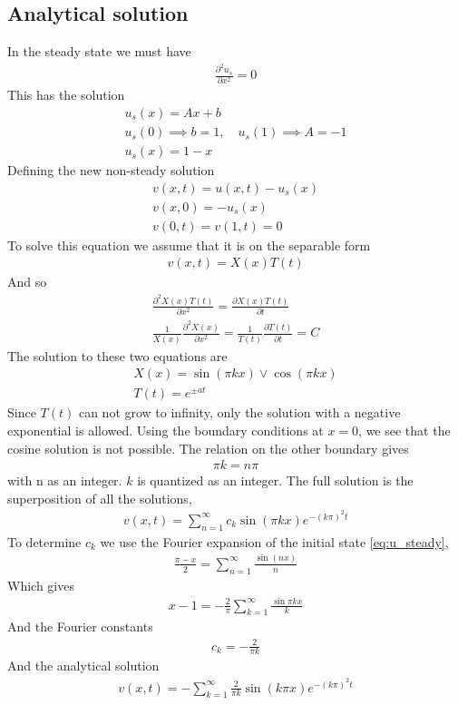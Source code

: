 \documentclass[11pt,a4paper,draft]{article}
\numberwithin{equation}{section}
\begin{document}
\subsection{Analytical solution}
In the steady state we must have
\begin{gather}
\frac{\partial^2 u_s}{\partial x^2} = 0
\end{gather}
This has the solution
\begin{gather}
u_s(x) = Ax + b\\
u_s(0) \implies b = 1, \quad
u_s(1) \implies A = -1\\
u_s(x) = 1-x \label{eq:u_steady}
\end{gather}
Defining the new non-steady solution
\begin{gather}
v(x,t) = u(x,t) - u_s(x)\\
v(x,0) = -u_s(x)\\
v(0,t) = v(1, t) = 0
\end{gather}
To solve this equation we assume that it is on the separable form
\begin{gather}
v(x,t) = X(x)T(t)
\end{gather}
And so
\begin{gather}
\frac{\partial^2 X(x)T(t)}{\partial x^2}
= \frac{\partial X(x)T(t)}{\partial t}\\
\frac{1}{X(x)}\frac{\partial^2 X(x)}{\partial x^2}
 = \frac{1}{T(t)}\frac{\partial T(t)}{\partial t} = C
 \label{eq:coupled_constant}
\end{gather}
The solution to these two equations are 
\begin{gather}
X(x) = \sin(\pi kx) \lor \cos(\pi kx)\\
T(t) = e^{\pm at}
\end{gather}
Since $T(t)$ can not grow to infinity, only the solution with a 
negative exponential is allowed. Using the boundary conditions at 
$x=0$, we see that the cosine solution is not possible.
The relation on the other boundary gives 
\begin{gather}
\pi k = n\pi
\end{gather}
with n as an integer. $k$ is quantized as an integer. The full solution 
is the superposition of all the solutions,
\begin{gather}
v(x,t) = \sum_{n=1}^\infty c_k \sin(\pi kx)e^{-(k\pi)^2t}
\end{gather}
To determine $c_k$ we use the Fourier expansion of the initial 
state \eqref{eq:u_steady}, 
\begin{gather}
\frac{\pi - x}{2} = \sum_{n=1}^\infty \frac{\sin(nx)}{n}
\end{gather}
Which gives
\begin{gather}
x-1 = -\frac{2}{\pi}\sum_{k=1}^\infty \frac{\sin\pi kx}{k}
\end{gather}
And the Fourier constants
\begin{gather}
c_k = -\frac{2}{\pi k}
\end{gather}
And the analytical solution
\begin{gather}
v(x,t) = -\sum_{k=1}^\infty \frac{2}{\pi k}\sin(k\pi x)e^{-(k\pi)^2t}
\end{gather}
\end{document}
